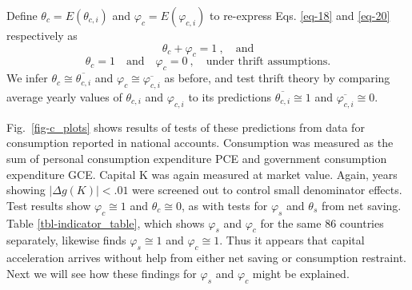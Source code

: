 \documentclass[a4paper,fleqn]{latex_styles/cas-sc}
\begin{document}
%
Define \(\theta_{c} = E\left( \theta_{c,i} \right)\) and
\(\varphi_{c} = E\left( \varphi_{c,i} \right)\) to re-express
Eqs. \eqref{eq-18} and \eqref{eq-20} respectively as
\begin{equation}
    \theta_c + \varphi_c = 1 \ , \quad \text{and}
    \label{eq-20}
\end{equation}
\vspace{-5ex}
\begin{equation}
    \theta_c = 1 \quad \text{and} \quad \varphi_c = 0 \ , \quad \text{under thrift assumptions.}
    \label{eq-21}
\end{equation}
We infer \(\theta_c \cong \overline{\theta_{c,i}}\) and \(\varphi_c \cong \overline{\varphi_{c,i}}\) as before, and test thrift theory by comparing average yearly values of $\theta_{c,i}$ and $\varphi_{c,i}$ to its predictions $\overline{\theta_{c,i}} \cong 1$ and $\overline{\varphi_{c,i}} \cong 0$.

Fig.~\ref{fig-c_plots} shows results of tests of these predictions from
data for consumption reported in national accounts. Consumption was
measured as the sum of personal consumption expenditure PCE and
government consumption expenditure GCE. Capital K was again measured at
market value. Again, years showing \(|\Delta g(K)| < .01\) were screened
out to control small denominator effects. Test results show
\(\varphi_{c} \cong 1\) and \(\theta_{c} \cong 0\), as with tests for
\(\varphi_{s}\) and \(\theta_{s}\) from net saving. Table \ref{tbl-indicator_table}, which shows $\varphi_s$ and $\varphi_{c}$ for the same 86 countries separately, likewise finds $\varphi_s \cong 1$ and $\varphi_c \cong 1$. Thus it appears
that capital acceleration arrives without help from either net
saving or consumption restraint. Next we will see how
these findings for \(\varphi_{s}\) and \(\varphi_{c}\) might be
explained.
  
\FloatBarrier

\FloatBarrier
\end{document}
